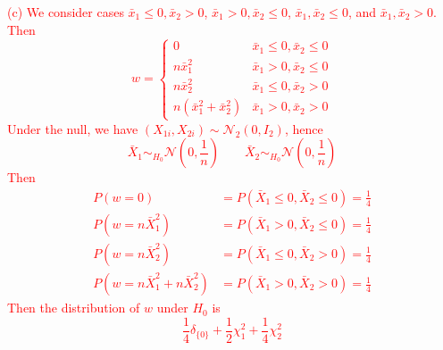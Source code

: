 \documentclass[12pt]{article}
\begin{document}
\noindent \textcolor{red}{
(c) We consider cases $\bar x_1 \leq 0, \bar x_2 > 0$, $\bar x_1 > 0, \bar x_2 \leq 0$, $\bar x_1, \bar x_2 \leq 0$, and $\bar x_1, \bar x_2 > 0$. Then 
\begin{equation*}
    w = \begin{cases}
        0 & \bar x_1 \leq 0, \bar x_2\leq 0\\
        n\bar x_1^2 & \bar x_1 > 0, \bar x_2 \leq 0\\
        n\bar x_2^2 & \bar x_1 \leq 0, \bar x_2 > 0\\
        n(\bar x_1^2 + \bar x_2^2) & \bar x_1 > 0, \bar x_2 > 0
    \end{cases}
\end{equation*}
Under the null, we have $(X_{1i}, X_{2i}) \sim \mathcal N_2(0, I_2)$, hence 
\begin{equation*}
    \bar X_1 \sim_{H_0} \mathcal N\left(0, \frac 1n\right) \qquad \bar X_2 \sim_{H_0} \mathcal N\left( 0, \frac 1n \right)
\end{equation*}
Then 
\begin{align*}
    P(w = 0) &= P(\bar X_1 \leq 0, \bar X_2 \leq 0) = \frac{1}{4}\\
    P(w = n\bar X_1^2) &= P(\bar X_1 > 0, \bar X_2 \leq 0) = \frac 14\\
    P(w = n\bar X_2^2) &= P(\bar X_1 \leq 0, \bar X_2 > 0) = \frac 14\\
    P(w = n\bar X_1^2 + n\bar X_2^2) &= P(\bar X_1 > 0, \bar X_2 > 0) = \frac 14
\end{align*}
Then the distribution of $w$ under $H_0$ is 
\begin{equation*}
    \frac{1}{4}\delta_{\{0\}} + \frac 12 \chi_1^2 + \frac 14 \chi_2^2
\end{equation*}
}
\end{document}

